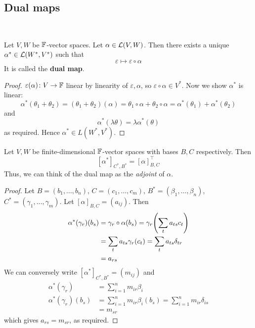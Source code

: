 \documentclass[a4paper]{article}
\begin{document}
\subsection{Dual maps}\ \vspace{-1.5em}
\begin{lemma}
	Let $ V, W $ be $ {\mathbb{F}} $-vector spaces.
	Let $ \alpha \in {\mathcal{L}}(V,W) $.
	Then there exists a unique $ \alpha^* \in {\mathcal{L}}(W^*, V^*) $ such that
	\[
		\varepsilon \mapsto \varepsilon \circ \alpha
	\]
	It is called the \textbf{dual map}.
\end{lemma}
\begin{proof}
	$ \varepsilon(\alpha) \colon V \to {\mathbb{F}} $ linear by linearity of $ \varepsilon, \alpha $,	so $ \varepsilon \circ \alpha \in V^* $.
	Now we show $ \alpha^* $ is linear:
	\[
		\alpha^*(\theta_1 + \theta_2) = (\theta_1 + \theta_2)(\alpha) = \theta_1 \circ \alpha + \theta_2 \circ \alpha = \alpha^*(\theta_1) + \alpha^*(\theta_2)
	\]
	and
	\[
		\alpha^*(\lambda \theta) = \lambda \alpha^*(\theta)
	\]
	as required.
	Hence $ \alpha^* \in L(W^*, V^*) $.
\end{proof}
\begin{proposition}
	Let $ V, W $ be finite-dimensional $ {\mathbb{F}} $-vector spaces with bases $ B, C $ respectively.
	Then
	\[
		[\alpha^*]_{C^*, B^*} = [\alpha]^\top_{B, C}
	\]
	Thus, we can think of the dual map as the \textit{adjoint} of $ \alpha $.
\end{proposition}
\begin{proof}
	Let $ B = (b_1, \dots, b_n) $, $ C = (c_1, \dots, c_m) $, $ B^* = (\beta_1, \dots, \beta_n) $, $ C^* = (\gamma_1, \dots, \gamma_m) $.
	Let $ [\alpha]_{B,C} = (a_{ij}) $.
	Then
	\begin{align*}
		\alpha^*(\gamma_r)(b_s) & = \gamma_r \circ \alpha(b_s)= \gamma_r \qty( \sum_t a_{ts} c_t ) \\
		                            & = \sum_t a_{ts} \gamma_r(c_t) = \sum_t a_{ts} \delta_{tr}          \\
		                            & = a_{rs}
	\end{align*}
	We can conversely write $ [\alpha^*]_{C^*, B^*} = (m_{ij}) $ and
	\begin{align*}
		\alpha^*(\gamma_r)      & = \sum_{i=1}^n m_{ir} \beta_i      \\
		\alpha^*(\gamma_r)(b_s) & = \sum_{i=1}^n m_{ir} \beta_i(b_s)= \sum_{i=1}^n m_{ir} \delta_{is}  \\
		                            & = m_{sr}
	\end{align*}
	which gives $ a_{rs} = m_{sr} $, as required.
\end{proof}
\end{document}

